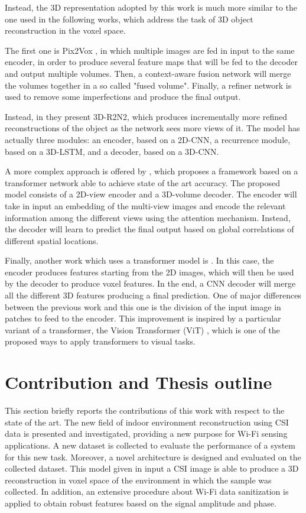 \documentclass[binding=0.6cm,noexaminfo]{sapthesis}
\begin{document}
Instead, the 3D representation adopted by this work is much more similar to the one used in the following works, which address the task of 3D object reconstruction in the voxel space.

The first one is Pix2Vox \cite{pix2vox}, in which multiple images are fed in input to the same encoder, in order to produce several feature maps that will be fed to the decoder and output multiple volumes. Then, a context-aware fusion network  will merge the volumes together in a so called "fused volume". Finally, a refiner network is used to remove some imperfections and produce the final output.

Instead, in \cite{3d-r2n2} they present 3D-R2N2, which produces incrementally more refined reconstructions of the object as the network sees more views of it. The model has actually three modules: an encoder, based on a 2D-CNN, a recurrence module, based on a 3D-LSTM, and a decoder, based on a 3D-CNN.

A more complex approach is offered by \cite{multi-view-3d-transformer}, which proposes a framework based on a transformer network \cite{attention-is-all-you-need} able to achieve state of the art accuracy. The proposed model consists of a 2D-view encoder and a 3D-volume decoder. The encoder will take in input an embedding of the multi-view images and encode the relevant information among the different views using the attention mechanism. Instead, the decoder will learn to predict the final output based on global correlations of different spatial locations.

Finally, another work which uses a transformer model is \cite{3d-retr}. In this case, the encoder produces features starting from the 2D images, which will then be used by the decoder to produce voxel features. In the end, a CNN decoder will merge all the different 3D features producing a final prediction. One of major differences between the previous work and this one is the division of the input image in patches to feed to the encoder. This improvement is inspired by a particular variant of a transformer, the Vision Transformer (ViT) \cite{vit}, which is one of the proposed ways to apply transformers to visual tasks.


\section{Contribution and Thesis outline}\label{sec:contribution-outline}
This section briefly reports the contributions of this work with respect to the state of the art. The new field of indoor environment reconstruction using CSI data is presented and investigated, providing a new purpose for Wi-Fi sensing applications. A new dataset is collected to evaluate the performance of a system for this new task. Moreover, a novel architecture is designed and evaluated on the collected dataset. This model given in input a CSI image is able to produce a 3D reconstruction in voxel space of the environment in which the sample was collected. In addition, an extensive procedure about Wi-Fi data sanitization is applied to obtain robust features based on the signal amplitude and phase.
\end{document}
